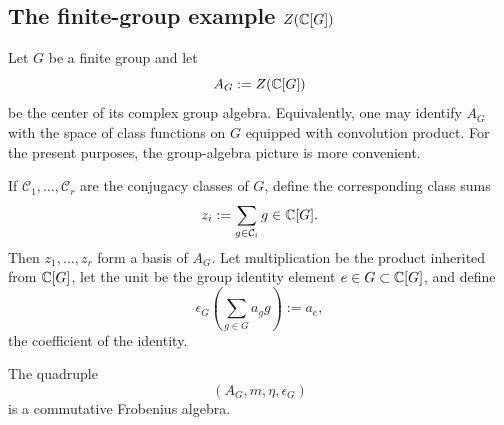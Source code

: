 \subsection{The finite-group example \texorpdfstring{$Z(\mathbb{C}[G])$}{Z(C[G])}}

\begin{example}\label{ex:center-group-algebra}
Let $G$ be a finite group and let
\begin{equation}\label{eq:ZG-definition}
A_G := Z(\mathbb{C}[G])
\end{equation}
be the center of its complex group algebra. Equivalently, one may identify $A_G$ with the space of class functions on $G$ equipped with convolution product. For the present purposes, the group-algebra picture is more convenient.

If $\mathcal{C}_1,\dots,\mathcal{C}_r$ are the conjugacy classes of $G$, define the corresponding class sums
\begin{equation}\label{eq:class-sums}
z_i := \sum_{g \in \mathcal{C}_i} g \in \mathbb{C}[G].
\end{equation}
Then $z_1,\dots,z_r$ form a basis of $A_G$. Let multiplication be the product inherited from $\mathbb{C}[G]$, let the unit be the group identity element $e \in G \subset \mathbb{C}[G]$, and define
\begin{equation}\label{eq:group-trace}
\epsilon_G\!\left(\sum_{g \in G} a_g g\right) := a_e,
\end{equation}
the coefficient of the identity.
\end{example}

\begin{proposition}\label{prop:ZG-frobenius}
The quadruple
\begin{equation}\label{eq:ZG-quadruple}
(A_G,m,\eta,\epsilon_G)
\end{equation}
is a commutative Frobenius algebra.
\end{proposition}

